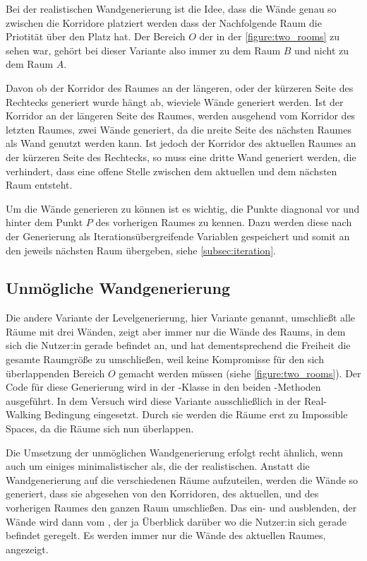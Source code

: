 Bei der realistischen Wandgenerierung ist die Idee, dass die Wände genau so zwischen die Korridore platziert werden dass der Nachfolgende Raum die Priotität über den Platz hat. Der Bereich $O$ der in der \autoref{figure:two_rooms} zu sehen war, gehört bei dieser Variante also immer zu dem Raum $B$ und nicht zu dem Raum $A$.

Davon ob der Korridor des Raumes an der längeren, oder der kürzeren Seite des Rechtecks generiert wurde hängt ab, wieviele Wände generiert werden. Ist der Korridor an der längeren Seite des Raumes, werden ausgehend vom Korridor des letzten Raumes, zwei Wände generiert, da die nreite Seite des nächsten Raumes als Wand genutzt werden kann. Ist jedoch der Korridor des aktuellen Raumes an der kürzeren Seite des Rechtecks, so muss eine dritte Wand generiert werden, die verhindert, dass eine offene Stelle zwischen dem aktuellen und dem nächsten Raum entsteht.

Um die Wände generieren zu können ist es wichtig, die Punkte diagnonal vor und hinter dem Punkt $P$ des vorherigen Raumes zu kennen. Dazu werden diese nach der Generierung als Iterationsübergreifende Variablen gespeichert und somit an den jeweils nächsten Raum übergeben, siehe \autoref{subsec:iteration}.


\subsection{Unmögliche Wandgenerierung}
Die andere Variante der Levelgenerierung, hier  Variante genannt, umschließt alle Räume mit drei Wänden, zeigt aber immer nur die Wände des Raums, in dem sich die Nutzer:in gerade befindet an, und hat dementsprechend die Freiheit die gesamte Raumgröße zu umschließen, weil keine Kompromisse für den sich überlappenden Bereich $O$ gemacht werden müssen (siehe \autoref{figure:two_rooms}). Der Code für diese Generierung wird in der  -Klasse in den beiden -Methoden ausgeführt. In dem Versuch wird diese Variante ausschließlich in der Real-Walking Bedingung eingesetzt. Durch sie werden die Räume erst zu Impossible Spaces, da die Räume sich nun überlappen.

Die Umsetzung der unmöglichen Wandgenerierung erfolgt recht ähnlich, wenn auch um einiges minimalistischer als, die der realistischen. Anstatt die Wandgenerierung auf die verschiedenen Räume aufzuteilen, werden die Wände so generiert, dass sie abgesehen von den Korridoren, des aktuellen, und des vorherigen Raumes den ganzen Raum umschließen. Das ein- und ausblenden, der Wände wird dann vom , der ja Überblick darüber wo die Nutzer:in sich gerade befindet geregelt. Es werden immer nur die Wände des aktuellen Raumes, angezeigt.

